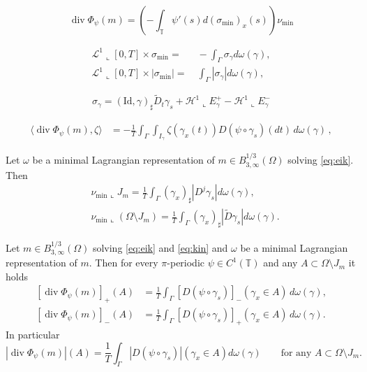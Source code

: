 \documentclass[10pt,a4paper]{amsart}
\DeclareMathOperator{\dv}{div}
\newcommand{\T}{{\mathbb T}}
\renewcommand{\L}{{\mathcal L}}
\begin{document}
\begin{equation}\label{e:ent-kin}
 \dv \Phi_\psi(m) = \left( - \int_\T \psi'(s) d (\sigma_{\min})_x(s) \right) \nu_{\min}
\end{equation}

\begin{equation}\label{e:kin-lagr}
\begin{split}
\L^1\llcorner [0,T] \times \sigma_{\min} = &~ - \int_\Gamma \sigma_\gamma d\omega(\gamma), \\
\L^1\llcorner [0,T] \times |\sigma_{\min}| = &~ \int_\Gamma |\sigma_\gamma| d\omega(\gamma),
\end{split}
\end{equation}

\begin{equation}\label{e:def-sigma-gamma}
\sigma_\gamma = (\mathrm{Id}, \gamma)_\sharp  \tilde D_t \gamma_s + \mathcal H^1\llcorner E_{\gamma}^+ -\mathcal H^1\llcorner E_{\gamma}^-
\end{equation}

\begin{align}\label{e:repr_entr}
\langle \dv\Phi_\psi(m),\zeta\rangle
&
=-\frac1T\int_{\Gamma}  \int_{I_\gamma}\zeta(\gamma_x(t))D(\psi\circ\gamma_s)(dt)\, d\omega(\gamma)\,,
\end{align}

\begin{lem}\label{l:jumpLE}
Let $\omega$ be a minimal Lagrangian representation of $m \in B^{1/3}_{3,\infty}(\Omega)$ solving \eqref{eq:eik}.
Then 
\[
\begin{split}
&\nu_{\min}\llcorner J_m =  \frac1T \int_\Gamma (\gamma_x)_\sharp |D^j\gamma_s| d\omega (\gamma), \\
&\nu_{\min}\llcorner (\Omega \setminus J_m) =  \frac1T \int_\Gamma (\gamma_x)_\sharp |\tilde D\gamma_s| d\omega (\gamma).
\end{split}
\]
\end{lem}

\begin{lem}\label{l:abs_no_jumps}
Let $m \in B^{1/3}_{3,\infty}(\Omega)$ solving \eqref{eq:eik} and \eqref{eq:kin} and $\omega$ be a minimal Lagrangian representation of $m$.
Then for every $\pi$-periodic $\psi \in C^1(\T)$  and any $A \subset \Omega \setminus J_m$ it holds
\[
\begin{split}
[\dv \Phi_\psi (m)]_+ (A) & = \frac1T \int_\Gamma [D(\psi \circ \gamma_s)]_- (\gamma_x \in A) \, d\omega (\gamma),\\
[\dv \Phi_\psi (m)]_- (A) & = \frac1T \int_\Gamma [D(\psi \circ \gamma_s)]_+ (\gamma_x \in A) \, d\omega (\gamma).
\end{split}
\]
In particular
\[
|\dv \Phi_\psi (m)| (A) = \frac1T \int_\Gamma |D(\psi \circ \gamma_s)| (\gamma_x \in A) d\omega (\gamma) \qquad \mbox{for any } A \subset \Omega \setminus J_m.
\]
\end{lem}
\end{document}
